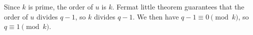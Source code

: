 Since ${k}$ is prime, the order of ${u}$ is ${k}$. Fermat little theorem guarantees that the order of ${u}$ divides $q-1$, so ${k}$ divides $q-1$. We then have $q-1\equiv 0\pmod{{k}}$, so $q\equiv 1\pmod{{k}}$.